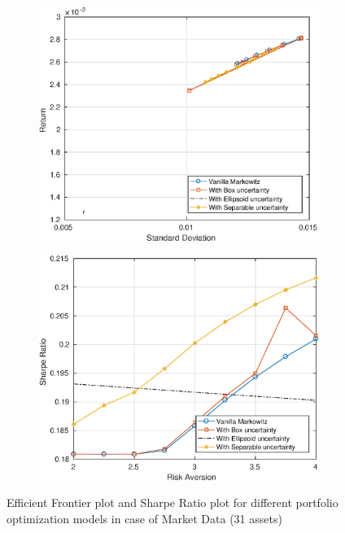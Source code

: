 \documentclass[12pt]{article}
\numberwithin{equation}{section}
\begin{document}
\begin{figure}[h]
\centering
\begin{subfigure}{.5\textwidth}
  \centering
  \includegraphics[width=.8\linewidth]{30_ef_ideal_range.eps}
\end{subfigure}%
\begin{subfigure}{.5\textwidth}
  \centering
  \includegraphics[width=.8\linewidth]{30_sr_ideal_range.eps}
\end{subfigure}
\caption{Efficient Frontier plot and Sharpe Ratio plot for different portfolio optimization models in case of Market Data (31 assets)}
\label{fig:3}
\end{figure}
\end{document}
